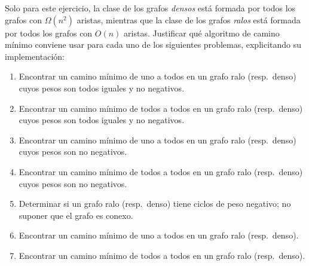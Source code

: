 

 \item Solo para este ejercicio, la clase de los grafos \emph{densos} está formada por todos los grafos con $\Omega(n^2)$ aristas, mientras que la clase de los grafos \emph{ralos} está formada por todos los grafos con $O(n)$ aristas.  Justificar qué algoritmo de camino mínimo conviene usar para cada uno de los siguientes problemas, explicitando su implementación:
 \begin{enumerate}[label=$\alph*$.,ref=$\alph*$]
   \item Encontrar un camino mínimo de uno a todos en un grafo ralo (resp.\ denso) cuyos pesos son todos iguales y no negativos.
   \item Encontrar un camino mínimo de todos a todos en un grafo ralo (resp.\ denso) cuyos pesos son todos iguales y no negativos.
   \item Encontrar un camino mínimo de uno a todos en un grafo ralo (resp.\ denso) cuyos pesos son no negativos.
   \item Encontrar un camino mínimo de todos a todos en un grafo ralo (resp.\ denso) cuyos pesos son no negativos.
   \item Determinar si un grafo ralo (resp.\ denso) tiene ciclos de peso negativo; no suponer que el grafo es conexo.
   \item Encontrar un camino mínimo de uno a todos en un grafo ralo (resp.\ denso).
   \item Encontrar un camino mínimo de todos a todos en un grafo ralo (resp.\ denso).
 \end{enumerate}


